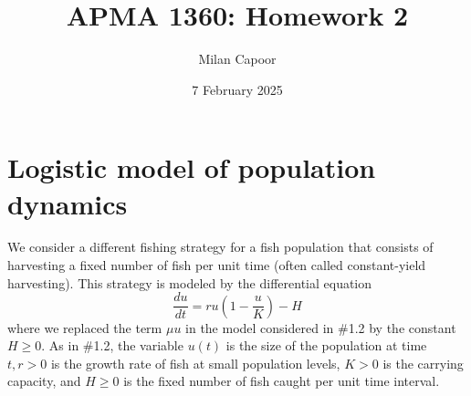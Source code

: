 \documentclass[12pt]{article}
\title{APMA 1360: Homework 2}
\author{Milan Capoor}
\date{7 February 2025}
\begin{document}
\maketitle

\section{Logistic model of population dynamics }
We consider a different fishing strategy for a fish population that consists of harvesting a fixed number of fish per unit time (often called constant-yield harvesting). This strategy is modeled by the differential equation
\[\frac{du}{dt} = ru\left(1- \frac{u}{K}\right) - H  \]
where we replaced the term $\mu u$ in the model considered in \#1.2 by the constant $H \geq 0$. As in \#1.2, the variable $u(t)$ is the size of the population at time $t, r > 0$ is the growth rate of fish at small population levels, $K > 0$ is the carrying capacity, and $H \geq 0$ is the fixed number of fish caught per unit time interval.
\end{document}

